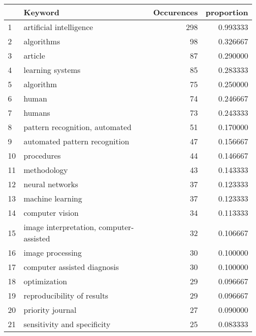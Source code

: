 \begin{tabular}{llrr}
\toprule
{} &                                  Keyword &  Occurences &  proportion \\
\midrule
1  &                  artificial intelligence &         298 &    0.993333 \\
2  &                               algorithms &          98 &    0.326667 \\
3  &                                  article &          87 &    0.290000 \\
4  &                         learning systems &          85 &    0.283333 \\
5  &                                algorithm &          75 &    0.250000 \\
6  &                                    human &          74 &    0.246667 \\
7  &                                   humans &          73 &    0.243333 \\
8  &           pattern recognition, automated &          51 &    0.170000 \\
9  &            automated pattern recognition &          47 &    0.156667 \\
10 &                               procedures &          44 &    0.146667 \\
11 &                              methodology &          43 &    0.143333 \\
12 &                          neural networks &          37 &    0.123333 \\
13 &                         machine learning &          37 &    0.123333 \\
14 &                          computer vision &          34 &    0.113333 \\
15 &  image interpretation, computer-assisted &          32 &    0.106667 \\
16 &                         image processing &          30 &    0.100000 \\
17 &              computer assisted diagnosis &          30 &    0.100000 \\
18 &                             optimization &          29 &    0.096667 \\
19 &               reproducibility of results &          29 &    0.096667 \\
20 &                         priority journal &          27 &    0.090000 \\
21 &              sensitivity and specificity &          25 &    0.083333 \\

\end{tabular}

